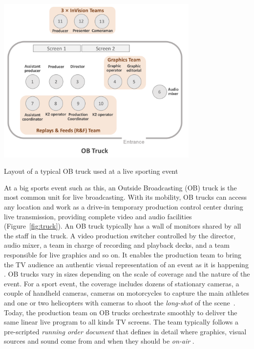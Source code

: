 \documentclass[sigchi-a, authorversion]{acmart}
\begin{document}
\begin{marginfigure}
\vspace{-10cm}
\hspace*{-2cm}
    \includegraphics[width=10cm]{Figures/OBtruck.png}
    \caption{Layout of a typical OB truck used at a live sporting event}
    \label{fig:truck}
\end{marginfigure}

At a big sports event such as this, an Outside Broadcasting (OB) truck is the most
common unit for live broadcasting. With its mobility, OB trucks can access any
location and work as a drive-in temporary production control center during live
transmission, providing complete video and audio facilities (Figure~\ref{fig:truck}).
An OB truck typically has a wall of monitors shared by all the staff in the truck.
A video production switcher controlled by the director, audio mixer, a team in
charge of recording and playback decks, and a team responsible for live graphics
and so on. It enables the production team to bring the TV audience an authentic
visual representation of an event as it is happening \cite{owens2015}.
OB trucks vary in sizes depending on the scale of coverage and the nature of the
event. For a sport event, the coverage includes dozens of stationary cameras, a
couple of handheld cameras, cameras on motorcycles to capture the main athletes
and one or two helicopters with cameras to shoot the \emph{long-shot} of the
scene~\cite{owens2015, Li:2018_TVX}. Today, the production team on OB trucks
orchestrate smoothly to deliver the same linear live program to all kinds TV
screens. The team typically follows a pre-scripted \emph{running order document} that
defines in detail where graphics, visual sources and sound come from and when
they should be \emph{on-air} \cite{Li:2018_TVX}.
\end{document}
